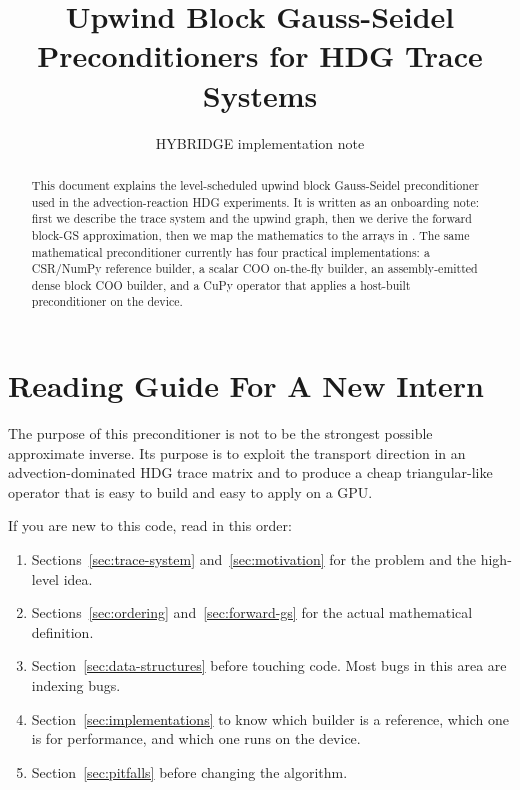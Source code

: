 \documentclass[11pt]{article}
\title{Upwind Block Gauss-Seidel Preconditioners for HDG Trace Systems}
\author{HYBRIDGE implementation note}
\date{}
\newcommand{\code}[1]{\texttt{\detokenize{#1}}}
\begin{document}
\maketitle

\begin{abstract}
This document explains the level-scheduled upwind block Gauss-Seidel
preconditioner used in the advection-reaction HDG experiments.  It is written
as an onboarding note: first we describe the trace system and the upwind graph,
then we derive the forward block-GS approximation, then we map the mathematics
to the arrays in \code{hybridge}.  The same mathematical preconditioner currently
has four practical implementations: a CSR/NumPy reference builder, a scalar COO
on-the-fly builder, an assembly-emitted dense block COO builder, and a CuPy
operator that applies a host-built preconditioner on the device.
\end{abstract}

\tableofcontents

\section{Reading Guide For A New Intern}

The purpose of this preconditioner is not to be the strongest possible
approximate inverse.  Its purpose is to exploit the transport direction in an
advection-dominated HDG trace matrix and to produce a cheap triangular-like
operator that is easy to build and easy to apply on a GPU.

If you are new to this code, read in this order:
\begin{enumerate}[nosep]
  \item Sections~\ref{sec:trace-system} and~\ref{sec:motivation} for the
        problem and the high-level idea.
  \item Sections~\ref{sec:ordering} and~\ref{sec:forward-gs} for the actual
        mathematical definition.
  \item Section~\ref{sec:data-structures} before touching code.  Most bugs in
        this area are indexing bugs.
  \item Section~\ref{sec:implementations} to know which builder is a reference,
        which one is for performance, and which one runs on the device.
  \item Section~\ref{sec:pitfalls} before changing the algorithm.
\end{enumerate}
\end{document}

